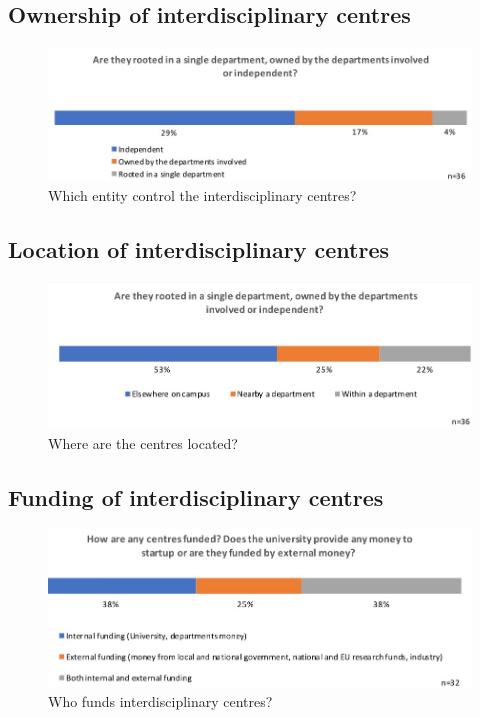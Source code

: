 \subsection{ Ownership of interdisciplinary centres}

\begin{figure}[h]
\centering
\includegraphics[width = \linewidth]{charts/5c.jpg}
\caption{Which entity control the interdisciplinary centres?}
\label{sect5:owners}
\end{figure}

\subsection{ Location of interdisciplinary centres}

\begin{figure}[h]
\centering
\includegraphics[width = \linewidth]{charts/5d.jpg}
\caption{ Where are the centres located?}
\label{sect5:locations}
\end{figure}

\subsection{Funding of interdisciplinary centres}

\begin{figure}[h]
\centering
\includegraphics[width = \linewidth]{charts/5e.jpg}
\caption{Who funds interdisciplinary centres?}
\label{sect5:funding}
\end{figure}

